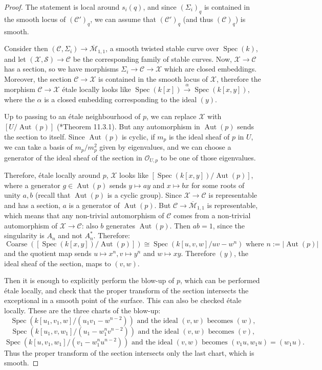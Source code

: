 \documentclass[11pt]{amsart}
\newcommand{\cC}{\mathcal{C}}
\newcommand{\sC}{\mathscr{C}}
\newcommand{\cX}{\mathcal{X}}
\newcommand{\cO}{\mathcal{O}}
\newcommand{\spec}{\operatorname{Spec}}
\newcommand{\Aut}{\operatorname{Aut}}
\theoremstyle{definition}
\begin{document}
\begin{proof}
The statement is local around $s_i(q)$, and since $(\Sigma_i)_q$ is contained in the smooth locus of $(\sC')_q$, we can assume that
$(\sC')_q$ (and thus $(\sC)_q$) is smooth.

Consider then $(\cC,\Sigma_i) \to \overline{\mathcal{M}}_{1,1}$, a smooth twisted stable curve over $\spec(k)$, and let $(\cX,\mathcal{S})\to \cC$ be the corresponding
family of stable curves.
Now, $\cX\to \cC$ has a section, so we have morphisms $\Sigma_i \to \cC \to \cX$ which are closed embeddings. Moreover, the section $\cC \to \cX$
is contained in the smooth locus of $\cX$, therefore the morphism $\cC \to \cX$ étale locally looks like
$ \spec(k[x])\xrightarrow{\alpha} \spec(k[x,y])$,
where the $\alpha$ is a closed embedding corresponding to the ideal $(y)$.

Up to passing to an étale neighbourhood of $p$, we can replace $\cX$ with $[U/\operatorname{Aut}(p)]$ (\cite{Olsson}*{Theorem 11.3.1}).
But any automorphism
in $\operatorname{Aut}(p)$ sends the section to itself. Since $\Aut(p)$ is cyclic, if $m_p$ is the ideal sheaf of $p$ in $U$,
we can take a basis of $m_p/m_p^2$ given by eigenvalues, and we can choose
a generator of the ideal sheaf of the section in $\cO_{U,p}$ to be one of those eigenvalues.

Therefore, étale locally around $p$, $\mathcal{X}$ looks like
$[\spec(k[x,y])/\operatorname{Aut}(p)]$,
where a generator $g \in \operatorname{Aut}(p)$ sends $y \mapsto ay$ and $x \mapsto bx$ for some roots of unity $a,b$ (recall that $\operatorname{Aut}(p)$ is
a cyclic group). Since $\cX \to \cC$ is representable and has a section, $a$ is a generator of $\operatorname{Aut}(p)$. But $\cC \to \overline{\mathcal{M}}_{1,1}$ is representable, which means that any non-trivial automorphism of $\cC$ comes from a non-trivial automorphism of $\cX \to \cC$: also $b$ generates $\operatorname{Aut}(p)$. Then $ab=1$,
since the singularity is $A_n$ and not $A_n^*$. Therefore:
$$\operatorname{Coarse}([\spec(k[x,y])/\operatorname{Aut}(p)]) \cong \spec(k[u,v,w]/uv-w^{n})\text{ where } n:=|\operatorname{Aut}(p)|$$ and the
quotient map sends $u \mapsto x^n,v\mapsto y^n$ and $w \mapsto xy$.
Therefore $(y)$, the ideal sheaf of the section, maps to $(v,w)$.

Then it is enough to explicitly perform the blow-up of $p$, which can be performed étale locally, and check that the proper
transform of the section intersects the exceptional in a smooth point of the surface. This can also be checked étale locally.
These are the three charts of the blow-up:
$$\spec(k[u_1,v_1,w]/(u_1v_1-w^{n-2})) \text{ and the ideal }(v,w) \text{ becomes } (w),$$
$$\spec(k[u_1,v,w_1]/(u_1-w_1^nv^{n-2})) \text{ and the ideal }(v,w) \text{ becomes } (v),$$
$$\spec(k[u,v_1,w_1]/(v_1-w_1^{n}u^{n-2})) \text{ and the ideal }(v,w) \text{ becomes } (v_1u,w_1u)=(w_1u).$$
Thus the proper transform of the section intersects only the last chart, which is smooth.


\end{proof}
\end{document}
